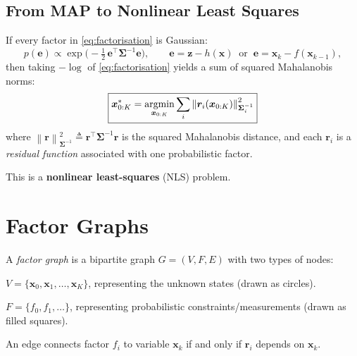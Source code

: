 \documentclass[11pt,a4paper]{article}
\newcommand{\state}{\bm{x}}
\newcommand{\meas}{\bm{z}}
\newcommand{\resid}{\bm{r}}
\newcommand{\cov}{\bm{\Sigma}}
\newcommand{\argmin}{\operatornamewithlimits{argmin}}
\newcommand{\mahal}[2]{\left\| #1 \right\|^{2}_{#2}}
\begin{document}
\subsection{From MAP to Nonlinear Least Squares}
\label{sec:map_to_nls}

If every factor in \eqref{eq:factorisation} is Gaussian:
\begin{equation}
  p(\bm{e}) \propto \exp\!\bigl(-\tfrac{1}{2}\,\bm{e}^{\!\top}
  \cov^{-1}\bm{e}\bigr),
  \qquad
  \bm{e} = \meas - h(\state)
  \;\;\text{or}\;\;
  \bm{e} = \state_k - f(\state_{k-1}),
\end{equation}
then taking $-\log$ of \eqref{eq:factorisation} yields a sum of squared
Mahalanobis norms:
\begin{equation}
  \boxed{
  \state_{0:K}^{*}
  = \argmin_{\state_{0:K}}
  \sum_{i} \mahal{\resid_i(\state_{0:K})}{\cov_i^{-1}}
  }
  \label{eq:nls}
\end{equation}
where $\mahal{\resid}{\cov^{-1}} \triangleq \resid^{\!\top}\cov^{-1}\resid$
is the squared Mahalanobis distance, and each $\resid_i$ is a \emph{residual
function} associated with one probabilistic factor.

This is a \textbf{nonlinear least-squares} (NLS) problem.

\section{Factor Graphs}
\label{sec:factor_graphs}

A \emph{factor graph} is a bipartite graph $G = (V, F, E)$ with two
types of nodes:

\begin{description}[nosep]
  \item[Variable nodes] $V = \{\state_0, \state_1, \ldots, \state_K\}$,
        representing the unknown states (drawn as circles).
  \item[Factor nodes] $F = \{f_0, f_1, \ldots\}$, representing
        probabilistic constraints/measurements (drawn as filled
        squares).
\end{description}

An edge connects factor $f_i$ to variable $\state_k$ if and only if
$\resid_i$ depends on $\state_k$.
\end{document}
